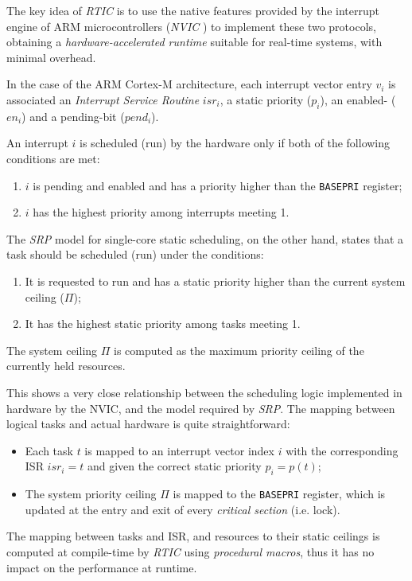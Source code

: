 The key idea of \textit{RTIC} is to use the native features provided by the
interrupt engine of ARM microcontrollers (\textit{NVIC}
\cite{armlimitedARMCortexM42009}) to implement these two protocols, obtaining a
\textit{hardware-accelerated runtime} suitable for real-time systems, with
minimal overhead.

In the case of the ARM Cortex-M architecture, each interrupt vector entry $v_i$
is associated an \textit{Interrupt Service Routine} $isr_i$, a static priority
($p_i$), an enabled- ($en_i$) and a pending-bit ($pend_i$). 

An interrupt $i$ is scheduled (run) by the hardware only if both of the
following conditions are met:
\begin{enumerate}
  \item $i$ is pending and enabled and has a priority higher than the
  \texttt{BASEPRI} register;
  \item $i$ has the highest priority among interrupts meeting 1.
\end{enumerate}

The \textit{SRP} model for single-core static scheduling, on the other hand,
states that a task should be scheduled (run) under the conditions: 
\begin{enumerate}
  \item It is requested to run and has a static priority higher than the current
  system ceiling ($\Pi$); 
  \item It has the highest static priority among tasks meeting 1.
\end{enumerate}
The system ceiling $\Pi$ is computed as the maximum priority ceiling of the
currently held resources. 

This shows a very close relationship between the scheduling logic implemented in
hardware by the NVIC, and the model required by \textit{SRP}. The mapping
between logical tasks and actual hardware is quite straightforward: 
\begin{itemize}
  \item Each task $t$ is mapped to an interrupt vector index $i$ with the
  corresponding ISR $isr_i = t$ and given the correct static priority $p_i =
  p(t)$; 
  \item The system priority ceiling $\Pi$ is mapped to the \texttt{BASEPRI}
  register, which is updated at the entry and exit of every \textit{critical
  section} (i.e. lock). 
\end{itemize}
The mapping between tasks and ISR, and resources to their static ceilings is
computed at compile-time by \textit{RTIC} using \textit{procedural macros}, thus
it has no impact on the performance at runtime. 


